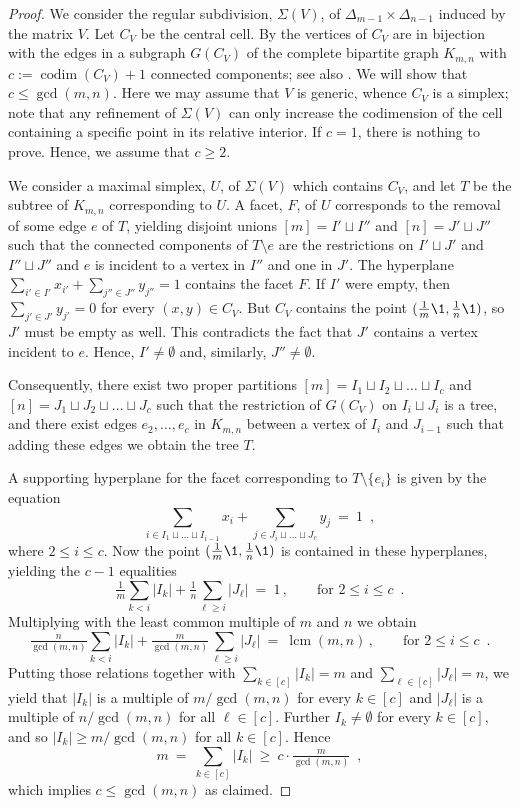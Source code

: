 \documentclass[a4paper,12pt]{amsart}
\DeclareMathOperator\codim{codim}
\DeclareMathOperator\lcm{lcm}
\theoremstyle{remark}
\begin{document}
\begin{proof}
  We consider the regular subdivision, $\Sigma(V)$, of $\Delta_{m-1}\times\Delta_{n-1}$ induced by the matrix $V$.
  Let $C_V$ be the central cell.
  By \cite[]{DLRS} the vertices of $C_V$ are in bijection with the edges in a subgraph $G(C_V)$ of the complete bipartite graph $K_{m,n}$ with $c:=\codim(C_V)+1$ connected components; see also \cite[]{ETC}.
  We will show that $c\leq\gcd(m,n)$.
  Here we may assume that $V$ is generic, whence $C_V$ is a simplex; note that any refinement of $\Sigma(V)$ can only increase the codimension of the cell containing a specific point in its relative interior.
  If $c=1$, there is nothing to prove.
  Hence, we assume that $c\geq 2$.
	
  We consider a maximal simplex, $U$, of $\Sigma(V)$ which contains $C_V$, and let $T$ be the subtree of $K_{m,n}$ corresponding to $U$.
  A facet, $F$, of $U$ corresponds to the removal of some edge $e$ of $T$, yielding disjoint unions $[m]=I'\sqcup I''$ and $[n]=J'\sqcup J''$ such that the connected components of $T\setminus e$ are the restrictions on $I'\sqcup J'$ and $I''\sqcup J''$ and $e$ is incident to a vertex in $I''$ and one in $J'$.
  The hyperplane $\sum_{i'\in I'}x_{i'}+\sum_{j''\in J''}y_{j''}=1$ contains the facet $F$.
  If $I'$ were empty, then $\sum_{j'\in J'}y_{j'}=0$ for every $(x,y)\in C_V$.
  But $C_V$ contains the point $(\tfrac{1}{m}\1,\tfrac{1}{n}\1)$, so $J'$ must be empty as well.
  This contradicts the fact that $J'$ contains a vertex incident to $e$.
  Hence, $I'\neq\emptyset$ and, similarly, $J''\neq\emptyset$.

  Consequently, there exist two proper partitions $[m]=I_1\sqcup I_2\sqcup\dots\sqcup I_c$ and $[n]=J_1\sqcup J_2\sqcup\dots\sqcup J_c$ such that the restriction of $G(C_V)$ on $I_i\sqcup J_i$ is a tree, and there exist edges $e_2,\dots,e_c$ in $K_{m,n}$ between a vertex of $I_{i}$ and $J_{i-1}$ such that adding these edges we obtain the tree $T$.

  A supporting hyperplane for the facet corresponding to $T\setminus\{e_i\}$ is given by the equation
  \[\sum_{i\in I_1\sqcup\dots\sqcup I_{i-1}}x_i+\sum_{j\in J_i\sqcup\dots\sqcup J_c}y_j \ = \ 1 \enspace ,\]
  where $2\leq i\leq c$.
  Now the point $(\tfrac{1}{m}\1,\tfrac{1}{n}\1)$ is contained in these hyperplanes, yielding the $c-1$ equalities
  \[\tfrac{1}{m}\sum_{k<i}|I_k|+\tfrac{1}{n}\sum_{\ell\geq i}|J_\ell| \ = \ 1 \,, \qquad \text{for } 2\leq i\leq c \enspace .\]
  Multiplying with the least common multiple of $m$ and $n$ we obtain
  \[\tfrac{n}{\gcd(m,n)}\sum_{k<i}|I_k|+\tfrac{m}{\gcd(m,n)}\sum_{\ell\geq i}|J_\ell| \ = \ \lcm(m,n) \,, \qquad \text{for } 2\leq i\leq c \enspace .\]
  Putting those relations together with $\sum_{k\in [c]}|I_k|=m$ and $\sum_{\ell\in[c]}|J_\ell|=n$, we yield that $|I_k|$ is a multiple of ${m}/{\gcd(m,n)}$ for every $k\in[c]$ and $|J_\ell|$ is a multiple of ${n}/{\gcd(m,n)}$ for all $\ell\in[c]$.
  Further $I_k\neq\emptyset$ for every $k\in[c]$, and so $|I_k|\geq{m}/{\gcd(m,n)}$ for all $k\in[c]$.
  Hence
  \[ m \ = \ \sum_{k\in[c]}|I_k| \ \geq \ c\cdot\tfrac{m}{\gcd(m,n)} \enspace ,\]
  which implies $c\leq\gcd(m,n)$ as claimed.
\end{proof}
\end{document}
